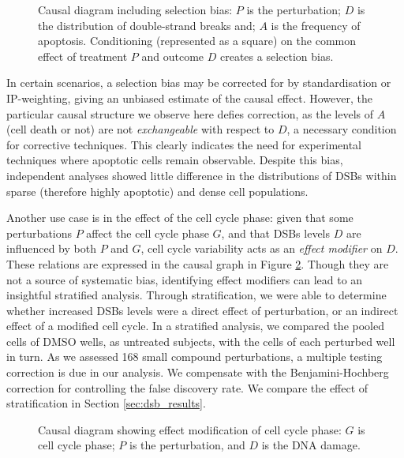 \begin{figure}[b!]
\centering
{}
\caption{Causal diagram including selection bias: $P$ is the perturbation; $D$ is the distribution of double-strand breaks and; $A$ is the frequency of apoptosis. Conditioning (represented as a square) on the common effect of treatment $P$ and outcome $D$ creates a selection bias.}
\label{fig:bias}
\end{figure}

In certain scenarios, a selection bias may be corrected for by standardisation or IP-weighting, giving an unbiased estimate of the causal effect. However, the particular causal structure we observe here defies correction, as the levels of $A$ (cell death or not) are not \emph{exchangeable} with respect to $D$, a necessary condition for corrective techniques. This clearly indicates the need for experimental techniques where apoptotic cells remain observable. Despite this bias, independent analyses showed little difference in the distributions of DSBs within sparse (therefore highly apoptotic) and dense cell populations.

Another use case is in the effect of the cell cycle phase: given that some perturbations $P$ affect the cell cycle phase $G$, and that DSBs levels $D$ are influenced by both $P$ and $G$, cell cycle variability acts as an \emph{effect modifier} on $D$. These relations are expressed in the causal graph in Figure \ref{fig:effectmodification}. Though they are not a source of systematic bias, identifying effect modifiers can lead to an insightful stratified analysis. Through stratification, we were able to determine whether increased DSBs levels were a direct effect of perturbation, or an indirect effect of a modified cell cycle. In a stratified analysis, we compared the pooled cells of DMSO wells, as untreated subjects, with the cells of each perturbed well in turn. As we assessed 168 small compound perturbations, a multiple testing correction is due in our analysis. We compensate with the Benjamini-Hochberg correction for controlling the false discovery rate. We compare the effect of stratification in Section \ref{sec:dsb_results}.

\begin{figure}
\centering
{}
\caption{Causal diagram showing effect modification of cell cycle phase: $G$ is cell cycle phase; $P$ is the perturbation, and $D$ is the DNA damage.} 
\label{fig:effectmodification}
\end{figure}

